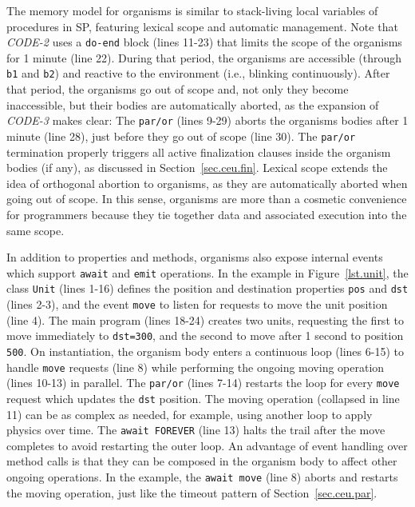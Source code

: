 \documentclass[preprint]{sigplanconf}
\newcommand{\code}[1] {{\small{\texttt{#1}}}}
\newcommand{\1}{\;}
\newcommand{\2}{\;\;}
\newcommand{\3}{\;\;\;}
\newcommand{\5}{\;\;\;\;\;}
\begin{document}
%

The memory model for organisms is similar to stack-living local variables of 
procedures in SP, featuring lexical scope and automatic management.
Note that \emph{CODE-2} uses a \code{do-end} block (lines 11-23) that limits 
the scope of the organisms for 1 minute (line 22).
%
During that period, the organisms are accessible (through \code{b1} and 
\code{b2}) and reactive to the environment (i.e., blinking continuously).
%
After that period, the organisms go out of scope and, not only they become 
inaccessible, but their bodies are automatically aborted, as the expansion of 
\emph{CODE-3} makes clear:
%
The \code{par/or} (lines 9-29) aborts the organisms bodies after 1 minute (line 
28), just before they go out of scope (line 30).
%
The \code{par/or} termination properly triggers all active finalization clauses 
inside the organism bodies (if any), as discussed in Section~\ref{sec.ceu.fin}.
%
Lexical scope extends the idea of orthogonal abortion to organisms, as they are 
automatically aborted when going out of scope.
%
In this sense, organisms are more than a cosmetic convenience for programmers 
because they tie together data and associated execution into the same scope.

In addition to properties and methods, organisms also expose internal events 
which support \code{await} and \code{emit} operations.
%
In the example in Figure~\ref{lst.unit}, the class \code{Unit} (lines 1-16) 
defines the position and destination properties \code{pos} and \code{dst} 
(lines 2-3), and the event \code{move} to listen for requests to move the unit 
position (line 4).
%
The main program (lines 18-24) creates two units, requesting the first to move 
immediately to \code{dst=300}, and the second to move after 1 second to 
position \code{500}.
%
On instantiation, the organism body enters a continuous loop (lines 6-15) to 
handle \code{move} requests (line 8) while performing the ongoing moving 
operation (lines 10-13) in parallel.
The \code{par/or} (lines 7-14) restarts the loop for every \code{move} request
which updates the \code{dst} position.
%
The moving operation (collapsed in line 11) can be as complex as needed, for 
example, using another loop to apply physics over time.
The \code{await FOREVER} (line 13) halts the trail after the move completes to 
avoid restarting the outer loop.
%
An advantage of event handling over method calls is that they can be composed 
in the organism body to affect other ongoing operations.
In the example, the \code{await move} (line 8) aborts and restarts the moving 
operation, just like the timeout pattern of Section~\ref{sec.ceu.par}.
\end{document}
